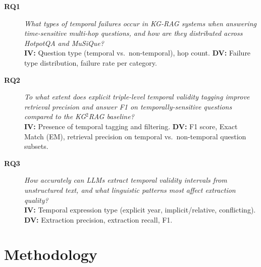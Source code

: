\documentclass[11pt]{article}
\begin{document}
\begin{description}
  \item[\textbf{RQ1}] \textit{What types of temporal failures occur in
    KG-RAG systems when answering time-sensitive multi-hop questions,
    and how are they distributed across HotpotQA and MuSiQue?}\\
    \textbf{IV:} Question type (temporal vs.\ non-temporal), hop count.
    \textbf{DV:} Failure type distribution, failure rate per category.

  \item[\textbf{RQ2}] \textit{To what extent does explicit triple-level
    temporal validity tagging improve retrieval precision and answer F1
    on temporally-sensitive questions compared to the KG$^2$RAG baseline?}\\
    \textbf{IV:} Presence of temporal tagging and filtering.
    \textbf{DV:} F1 score, Exact Match (EM), retrieval precision on
    temporal vs.\ non-temporal question subsets.

  \item[\textbf{RQ3}] \textit{How accurately can LLMs extract temporal
    validity intervals from unstructured text, and what linguistic patterns
    most affect extraction quality?}\\
    \textbf{IV:} Temporal expression type (explicit year, implicit/relative,
    conflicting).
    \textbf{DV:} Extraction precision, extraction recall, F1.
\end{description}

\section{Methodology}
\end{document}
